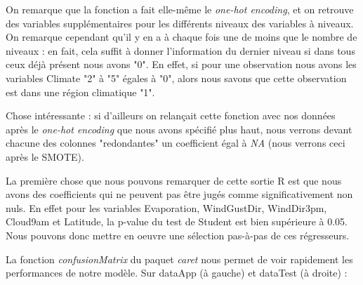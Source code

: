 \documentclass{article}
\begin{document}
On remarque que la fonction a fait elle-même le \emph{one-hot encoding}, et on retrouve des variables supplémentaires pour les différents niveaux des variables à niveaux. On remarque cependant qu'il y en a à chaque fois une de moins que le nombre de niveaux : en fait, cela suffit à donner l'information du dernier niveau si dans tous ceux déjà présent nous avons "0". En effet, si pour une observation nous avons les variables Climate "2" à "5" égales à "0", alors nous savons que cette observation est dans une région climatique "1". 

Chose intéressante : si d'ailleurs on relançait cette fonction avec nos données après le \emph{one-hot encoding} que nous avons spécifié plus haut, nous verrons devant chacune des colonnes "redondantes" un coefficient égal à \emph{NA} (nous verrons ceci après le SMOTE).

La première chose que nous pouvons remarquer de cette sortie R est que nous avons des coefficients qui ne peuvent pas être jugés comme significativement non nuls. En effet pour les variables Evaporation, WindGustDir, WindDir3pm, Cloud9am et Latitude, la p-value du test de Student est bien supérieure à 0.05. Nous pouvons donc mettre en oeuvre une sélection pas-à-pas de ces régresseurs.  

La fonction \emph{confusionMatrix} du paquet \emph{caret} nous permet de voir rapidement les performances de notre modèle. Sur dataApp (à gauche) et dataTest (à droite) : 
\end{document}
